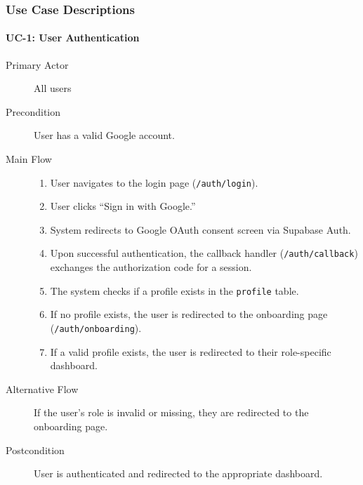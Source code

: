 \documentclass[11pt,a4paper]{article}
\begin{document}
\subsubsection{Use Case Descriptions}

\paragraph{UC-1: User Authentication}
\begin{description}
  \item[Primary Actor] All users
  \item[Precondition] User has a valid Google account.
  \item[Main Flow]
    \begin{enumerate}[leftmargin=1.5em]
      \item User navigates to the login page (\texttt{/auth/login}).
      \item User clicks ``Sign in with Google.''
      \item System redirects to Google OAuth consent screen via Supabase Auth.
      \item Upon successful authentication, the callback handler (\texttt{/auth/callback}) exchanges the authorization code for a session.
      \item The system checks if a profile exists in the \texttt{profile} table.
      \item If no profile exists, the user is redirected to the onboarding page (\texttt{/auth/onboarding}).
      \item If a valid profile exists, the user is redirected to their role-specific dashboard.
    \end{enumerate}
  \item[Alternative Flow] If the user's role is invalid or missing, they are redirected to the onboarding page.
  \item[Postcondition] User is authenticated and redirected to the appropriate dashboard.
\end{description}
\end{document}
